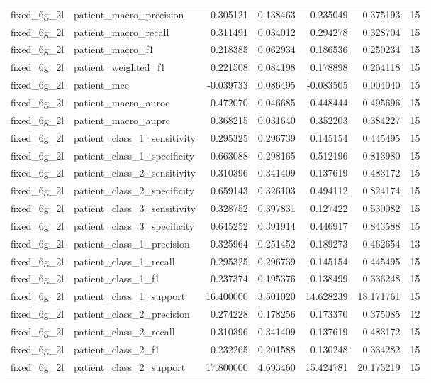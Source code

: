 \begin{tabular}{llrrrrr}
fixed_6g_2l & patient_macro_precision & 0.305121 & 0.138463 & 0.235049 & 0.375193 & 15 \\
fixed_6g_2l & patient_macro_recall & 0.311491 & 0.034012 & 0.294278 & 0.328704 & 15 \\
fixed_6g_2l & patient_macro_f1 & 0.218385 & 0.062934 & 0.186536 & 0.250234 & 15 \\
fixed_6g_2l & patient_weighted_f1 & 0.221508 & 0.084198 & 0.178898 & 0.264118 & 15 \\
fixed_6g_2l & patient_mcc & -0.039733 & 0.086495 & -0.083505 & 0.004040 & 15 \\
fixed_6g_2l & patient_macro_auroc & 0.472070 & 0.046685 & 0.448444 & 0.495696 & 15 \\
fixed_6g_2l & patient_macro_auprc & 0.368215 & 0.031640 & 0.352203 & 0.384227 & 15 \\
fixed_6g_2l & patient_class_1_sensitivity & 0.295325 & 0.296739 & 0.145154 & 0.445495 & 15 \\
fixed_6g_2l & patient_class_1_specificity & 0.663088 & 0.298165 & 0.512196 & 0.813980 & 15 \\
fixed_6g_2l & patient_class_2_sensitivity & 0.310396 & 0.341409 & 0.137619 & 0.483172 & 15 \\
fixed_6g_2l & patient_class_2_specificity & 0.659143 & 0.326103 & 0.494112 & 0.824174 & 15 \\
fixed_6g_2l & patient_class_3_sensitivity & 0.328752 & 0.397831 & 0.127422 & 0.530082 & 15 \\
fixed_6g_2l & patient_class_3_specificity & 0.645252 & 0.391914 & 0.446917 & 0.843588 & 15 \\
fixed_6g_2l & patient_class_1_precision & 0.325964 & 0.251452 & 0.189273 & 0.462654 & 13 \\
fixed_6g_2l & patient_class_1_recall & 0.295325 & 0.296739 & 0.145154 & 0.445495 & 15 \\
fixed_6g_2l & patient_class_1_f1 & 0.237374 & 0.195376 & 0.138499 & 0.336248 & 15 \\
fixed_6g_2l & patient_class_1_support & 16.400000 & 3.501020 & 14.628239 & 18.171761 & 15 \\
fixed_6g_2l & patient_class_2_precision & 0.274228 & 0.178256 & 0.173370 & 0.375085 & 12 \\
fixed_6g_2l & patient_class_2_recall & 0.310396 & 0.341409 & 0.137619 & 0.483172 & 15 \\
fixed_6g_2l & patient_class_2_f1 & 0.232265 & 0.201588 & 0.130248 & 0.334282 & 15 \\
fixed_6g_2l & patient_class_2_support & 17.800000 & 4.693460 & 15.424781 & 20.175219 & 15 \\

\end{tabular}
